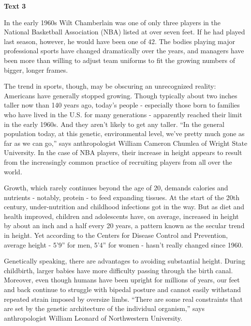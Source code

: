 
\begin{center}\textbf{Text 3}\end{center}

\qquad In the early 1960s Wilt Chamberlain was one of only three players in the National Basketball Association (NBA) listed at over seven feet. If he had played last season, however, he would have been one of 42.  The bodies playing major professional sports have changed dramatically over the years, and managers have been more than willing to adjust team uniforms to fit the growing numbers of bigger, longer frames.

\qquad The trend in sports, though, may be obscuring an unrecognized reality: Americans have generally stopped growing. Though typically about two inches taller now than 140 years ago, today's people - especially those born to families who have lived in the U.S. for many generations - apparently reached their limit in the early 1960s. And they aren't likely to get any taller. ``In the general population today, at this genetic, environmental level, we've pretty much gone as far as we can go,'' says anthropologist William Cameron Chumlea of Wright State University. In the case of NBA players, their increase in height appears to result from the increasingly common practice of recruiting players from all over the world.

\qquad Growth, which rarely continues beyond the age of 20, demands calories and nutrients - notably, protein - to feed expanding tissues. At the start of the 20th century, under-nutrition and childhood infections got in the way. But as diet and health improved, children and adolescents have, on average, increased in height by about an inch and a half every 20 years, a pattern known as the secular trend in height. Yet according to the Centers for Disease Control and Prevention, average height - 5'9'' for men, 5'4'' for women - hasn't really changed since 1960. 

\qquad Genetically speaking, there are advantages to avoiding substantial height. During childbirth, larger babies have more difficulty passing through the birth canal. Moreover, even though humans have been upright for millions of years, our feet and back continue to struggle with bipedal posture and cannot easily withstand repeated strain imposed by oversize limbs. ``There are some real constraints that are set by the genetic architecture of the individual organism,'' says anthropologist William Leonard of Northwestern University.

